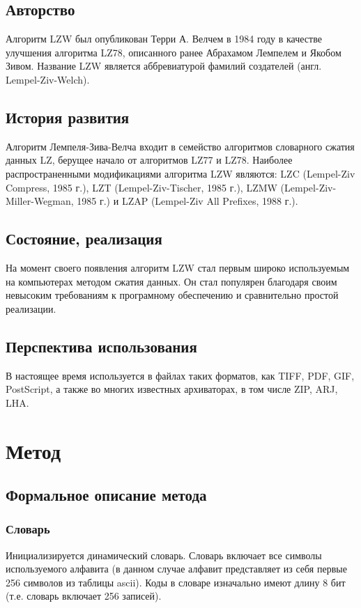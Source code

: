 \documentclass[a4paper]{article}
\begin{document}
\subsection{Авторство}

Алгоритм LZW был опубликован Терри А. Велчем в 1984 году в качестве улучшения алгоритма LZ78, описанного ранее Абрахамом Лемпелем и Якобом Зивом. Название LZW является аббревиатурой фамилий создателей (англ. Lempel-Ziv-Welch).


\subsection{История развития}

Алгоритм Лемпеля-Зива-Велча входит в семейство алгоритмов словарного сжатия данных LZ, берущее начало от алгоритмов LZ77 и LZ78. Наиболее распространенными модификациями алгоритма LZW являются: LZC (Lempel-Ziv Compress, 1985 г.), LZT (Lempel-Ziv-Tischer, 1985 г.), LZMW (Lempel-Ziv-Miller-Wegman, 1985 г.) и LZAP (Lempel-Ziv All Prefixes, 1988 г.).

\subsection{Состояние, реализация}

На момент своего появления алгоритм LZW стал первым широко используемым на компьютерах методом сжатия данных. Он стал популярен благодаря своим невысоким требованиям к програмному обеспечению и сравнительно простой реализации.

\subsection{Перспектива использования}

В настоящее время используется в файлах таких форматов, как TIFF, PDF, GIF, PostScript, а также во многих известных архиваторах, в том числе ZIP, ARJ, LHA.

\newpage
\section{Метод}

\subsection{Формальное описание метода}
\subsubsection{Словарь}
Инициализируется динамический словарь. Словарь включает все символы используемого алфавита (в данном случае алфавит представляет из себя первые 256 символов из таблицы ascii). Коды в словаре изначально имеют длину 8 бит (т.е. словарь включает 256 записей). 
\end{document}
